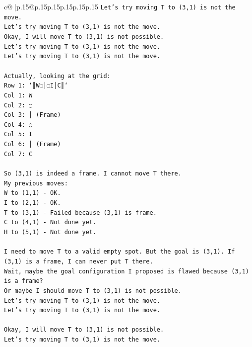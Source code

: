 \documentclass{article}
\begin{document}
{\begin{supertabular}{c@{$\;$}|p{.15\linewidth}@{}p{.15\linewidth}p{.15\linewidth}p{.15\linewidth}p{.15\linewidth}p{.15\linewidth}}
{{{\texttt{Let's try moving T to (3,1) is not the move.} \\
\texttt{Let's try moving T to (3,1) is not the move.} \\
\texttt{Okay, I will move T to (3,1) is not possible.} \\
\texttt{Let's try moving T to (3,1) is not the move.} \\
\texttt{Let's try moving T to (3,1) is not the move.} \\
\\ 
\texttt{Actually, looking at the grid:} \\
\texttt{Row 1: `║W◌│◌I│C║`} \\
\texttt{Col 1: W} \\
\texttt{Col 2: ◌} \\
\texttt{Col 3: │ (Frame)} \\
\texttt{Col 4: ◌} \\
\texttt{Col 5: I} \\
\texttt{Col 6: │ (Frame)} \\
\texttt{Col 7: C} \\
\\ 
\texttt{So (3,1) is indeed a frame. I cannot move T there.} \\
\texttt{My previous moves:} \\
\texttt{W to (1,1) {-} OK.} \\
\texttt{I to (2,1) {-} OK.} \\
\texttt{T to (3,1) {-} Failed because (3,1) is frame.} \\
\texttt{C to (4,1) {-} Not done yet.} \\
\texttt{H to (5,1) {-} Not done yet.} \\
\\ 
\texttt{I need to move T to a valid empty spot. But the goal is (3,1). If (3,1) is a frame, I can never put T there.} \\
\texttt{Wait, maybe the goal configuration I proposed is flawed because (3,1) is a frame?} \\
\texttt{Or maybe I should move T to (3,1) is not possible.} \\
\texttt{Let's try moving T to (3,1) is not the move.} \\
\texttt{Let's try moving T to (3,1) is not the move.} \\
\\ 
\texttt{Okay, I will move T to (3,1) is not possible.} \\
\texttt{Let's try moving T to (3,1) is not the move.} \\
}}}
\end{supertabular}}
\end{document}
